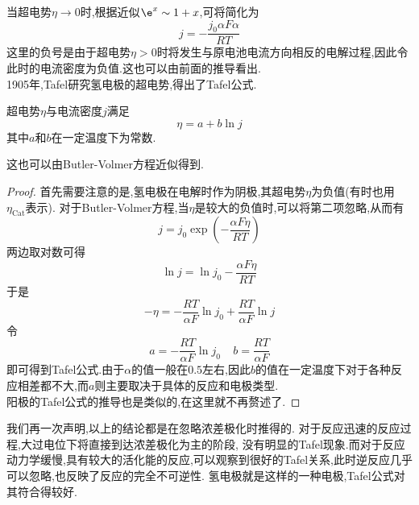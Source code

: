 \documentclass{ctexart}
\begin{document}
\indent 当超电势$\eta\to0$时,根据近似$\e^x\sim 1+x$,可将简化为
\[j=-\dfrac{j_0\alpha F\alpha}{RT}\]
这里的负号是由于超电势$\eta>0$时将发生与原电池电流方向相反的电解过程,因此令此时的电流密度为负值.这也可以由前面的推导看出.\vspace{4pt}\\
\indent 1905年,Tafel研究氢电极的超电势,得出了Tafel公式.
\begin{theorem}[6E.2.3 Tafel公式]
    超电势$\eta$与电流密度$j$满足
    \[\eta=a+b\ln j\]
    其中$a$和$b$在一定温度下为常数.
\end{theorem}
这也可以由Butler-Volmer方程近似得到.
\begin{proof}
    首先需要注意的是,氢电极在电解时作为阴极,其超电势$\eta$为负值(有时也用$\eta_{\text{Cat}}$表示).%
    对于Butler-Volmer方程,当$\eta$是较大的负值时,可以将第二项忽略,从而有
    \[j=j_0\exp\left(-\dfrac{\alpha F\eta}{RT}\right)\]
    两边取对数可得
    \[\ln j=\ln j_0-\dfrac{\alpha F\eta}{RT}\]
    于是
    \[-\eta=-\dfrac{RT}{\alpha F}\ln j_0+\dfrac{RT}{\alpha F}\ln j\]
    令
    \[a=-\dfrac{RT}{\alpha F}\ln j_0\ \ \ \ \ b=\dfrac{RT}{\alpha F}\]
    即可得到Tafel公式.由于$\alpha$的值一般在$0.5$左右,因此$b$的值在一定温度下对于各种反应相差都不大,而$a$则主要取决于具体的反应和电极类型.\\
    阳极的Tafel公式的推导也是类似的,在这里就不再赘述了.
\end{proof}
我们再一次声明,以上的结论都是在忽略浓差极化时推得的.%
对于反应迅速的反应过程,大过电位下将直接到达浓差极化为主的阶段,%
没有明显的Tafel现象.而对于反应动力学缓慢,具有较大的活化能的反应,可以观察到很好的Tafel关系,此时逆反应几乎可以忽略,也反映了反应的完全不可逆性.%
氢电极就是这样的一种电极,Tafel公式对其符合得较好.
\end{document}
